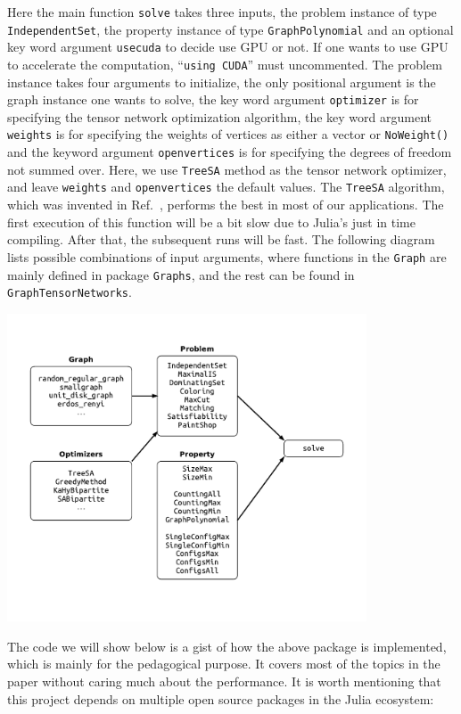 \documentclass[onefignum, onetabnum]{siamart190516}
\newcommand{\<}{\langle}
\renewcommand{\>}{\rangle}
\begin{document}
Here the main function \texttt{solve} takes three inputs, the problem instance of type \texttt{IndependentSet}, the property instance of type \texttt{GraphPolynomial} and an optional key word argument \texttt{usecuda} to decide use GPU or not.
If one wants to use GPU to accelerate the computation, ``\texttt{using CUDA}'' must uncommented.
The problem instance takes four arguments to initialize, the only positional argument is the graph instance one wants to solve, the key word argument \texttt{optimizer} is for specifying the tensor network optimization algorithm, the key word argument \texttt{weights} is for specifying the weights of vertices as either a vector or \texttt{NoWeight()} and the keyword argument \texttt{openvertices} is for specifying the degrees of freedom not summed over.
Here, we use \texttt{TreeSA} method as the tensor network optimizer, and leave \texttt{weights} and \texttt{openvertices} the default values. The \texttt{TreeSA} algorithm, which was invented in Ref.~\cite{Kalachev2021}, performs the best in most of our applications.
The first execution of this function will be a bit slow due to Julia's just in time compiling.
After that, the subsequent runs will be fast.
The following diagram lists possible combinations of input arguments, where functions in the \texttt{Graph} are mainly defined in package \texttt{Graphs}, and the rest can be found in \texttt{GraphTensorNetworks}.

\centerline{\includegraphics[width=0.8\textwidth, trim={0cm 1cm 0cm 1cm}, clip]{figures/fig7.pdf}}

The code we will show below is a gist of how the above package is implemented, which is mainly for the pedagogical purpose.
It covers most of the topics in the paper without caring much about the performance.
It is worth mentioning that this project depends on multiple open source packages in the Julia ecosystem:
\end{document}
